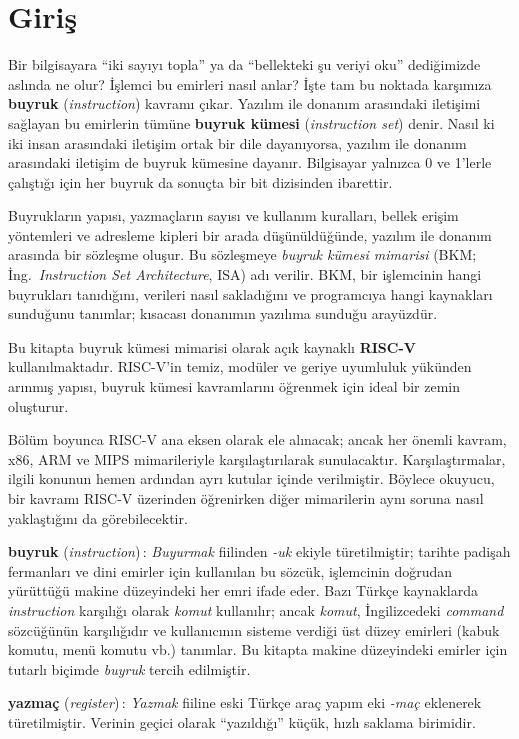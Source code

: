 \section{Giriş}

Bir bilgisayara ``iki sayıyı topla'' ya da ``bellekteki şu veriyi oku'' dediğimizde aslında ne olur? İşlemci bu emirleri nasıl anlar? İşte tam bu noktada karşımıza \textbf{buyruk} (\emph{instruction}) kavramı çıkar. Yazılım ile donanım arasındaki iletişimi sağlayan bu emirlerin tümüne \textbf{buyruk kümesi} (\emph{instruction set}) denir. Nasıl ki iki insan arasındaki iletişim ortak bir dile dayanıyorsa, yazılım ile donanım arasındaki iletişim de buyruk kümesine dayanır. Bilgisayar yalnızca 0 ve 1'lerle çalıştığı için her buyruk da sonuçta bir bit dizisinden ibarettir.

Buyrukların yapısı, yazmaçların sayısı ve kullanım kuralları, bellek erişim yöntemleri ve adresleme kipleri bir arada düşünüldüğünde, yazılım ile donanım arasında bir sözleşme oluşur. Bu sözleşmeye \emph{buyruk kümesi mimarisi} (BKM; İng.\ \emph{Instruction Set Architecture}, ISA) adı verilir. BKM, bir işlemcinin hangi buyrukları tanıdığını, verileri nasıl sakladığını ve programcıya hangi kaynakları sunduğunu tanımlar; kısacası donanımın yazılıma sunduğu arayüzdür.

Bu kitapta buyruk kümesi mimarisi olarak açık kaynaklı \textbf{RISC-V} kullanılmaktadır. RISC-V'in temiz, modüler ve geriye uyumluluk yükünden arınmış yapısı, buyruk kümesi kavramlarını öğrenmek için ideal bir zemin oluşturur.

Bölüm boyunca RISC-V ana eksen olarak ele alınacak; ancak her önemli kavram, x86, ARM ve MIPS mimarileriyle karşılaştırılarak sunulacaktır. Karşılaştırmalar, ilgili konunun hemen ardından ayrı kutular içinde verilmiştir. Böylece okuyucu, bir kavramı RISC-V üzerinden öğrenirken diğer mimarilerin aynı soruna nasıl yaklaştığını da görebilecektir.

\begin{terimnotu}
\textbf{buyruk} (\emph{instruction})\,: \emph{Buyurmak} fiilinden \emph{-uk} ekiyle türetilmiştir; tarihte padişah fermanları ve dini emirler için kullanılan bu sözcük, işlemcinin doğrudan yürüttüğü makine düzeyindeki her emri ifade eder. Bazı Türkçe kaynaklarda \emph{instruction} karşılığı olarak \emph{komut} kullanılır; ancak \emph{komut}, İngilizcedeki \emph{command} sözcüğünün karşılığıdır ve kullanıcının sisteme verdiği üst düzey emirleri (kabuk komutu, menü komutu vb.) tanımlar. Bu kitapta makine düzeyindeki emirler için tutarlı biçimde \emph{buyruk} tercih edilmiştir.

\textbf{yazmaç} (\emph{register})\,: \emph{Yazmak} fiiline eski Türkçe araç yapım eki \emph{-maç} eklenerek türetilmiştir. Verinin geçici olarak ``yazıldığı'' küçük, hızlı saklama birimidir.
\end{terimnotu}

